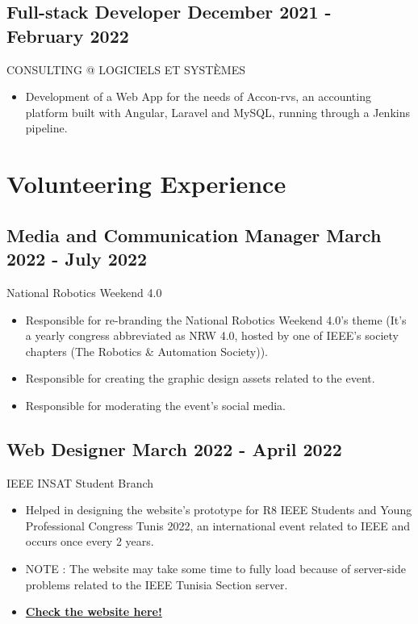 \documentclass[a4,10pt]{article}
\newcommand{\subtext}[1]{
#1\par\vspace{-0.2cm}}
\newenvironment{zitemize}{
\begin{itemize}\itemsep0pt \parskip0pt \parsep1pt}
{\end{itemize}\vspace{-0.5cm}}
\begin{document}
\subsection*{ Full-stack Developer \hfill December 2021 - February 2022} 
\subtext{CONSULTING @ LOGICIELS ET SYSTÈMES\hfill } 
    \begin{zitemize}
        \item  Development of a Web App for the needs of Accon-rvs, an accounting platform built with Angular, Laravel and MySQL, running through a Jenkins pipeline.
    \end{zitemize}
    






\section{Volunteering Experience}

\subsection*{Media and Communication Manager \hfill March 2022 - July 2022} 
\subtext{National Robotics Weekend 4.0\hfill } 
    \begin{zitemize}
        \item Responsible for re-branding the National Robotics Weekend 4.0's theme (It's a yearly congress abbreviated as NRW 4.0, hosted by one of IEEE's society chapters (The Robotics & Automation Society)).
        \item Responsible for creating the graphic design assets related to the event.
        \item Responsible for moderating the event's social media.
    \end{zitemize}

\subsection*{Web Designer \hfill March 2022 - April 2022} 
\subtext{IEEE INSAT Student Branch\hfill } 
    \begin{zitemize}
        \item Helped in designing the website's prototype for R8 IEEE Students and Young Professional Congress Tunis 2022, an international event related to IEEE and occurs once every 2 years.
        \item NOTE : The website may take some time to fully load because of server-side problems related to the IEEE Tunisia Section server.
                \item \href{https://r8syp.ieee.tn/}{\small \textbf {Check the website here!}}

    \end{zitemize}
    
\end{document}
